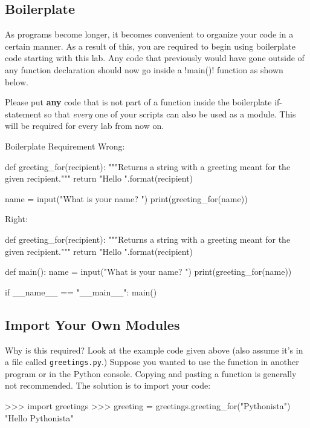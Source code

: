 \documentclass[11pt]{cselabheader}
\begin{document}
\subsection{Boilerplate}
\label{subsec:boiler}

As programs become longer, it becomes convenient to organize your code in
a certain manner. As a result of this, you are required to begin using
boilerplate code starting with this lab. Any code that previously would
have gone outside of any function declaration should now go inside a
\pythoninline!main()! function as shown below.

Please put \textbf{any} code that is not part of a function inside the
boilerplate if-statement so that \emph{every} one of your scripts can also be
used as a module. This will be required for every lab from now on.

\begin{infobox}{Boilerplate Requirement}
  Wrong:

  \begin{python3code}
def greeting_for(recipient):
    """Returns a string with a greeting meant for the given recipient."""
    return "Hello {}".format(recipient)

name = input("What is your name? ")
print(greeting_for(name))
  \end{python3code}

  Right:

  \begin{python3code}
def greeting_for(recipient):
    """Returns a string with a greeting meant for the given recipient."""
    return "Hello {}".format(recipient)

def main():
    name = input("What is your name? ")
    print(greeting_for(name))

if __name__ == "__main__":
    main()
  \end{python3code}
\end{infobox}

\subsection{Import Your Own Modules}
Why is this required? Look at the example code given above (also assume it's
in a file called \texttt{greetings.py}.) Suppose you wanted to use
the  function in another program or in the Python
console. Copying and pasting a function is generally not recommended. The
solution is to import your code:

\begin{pyconcode}
>>> import greetings
>>> greeting = greetings.greeting_for("Pythonista")
"Hello Pythonista"
\end{pyconcode}
\end{document}

